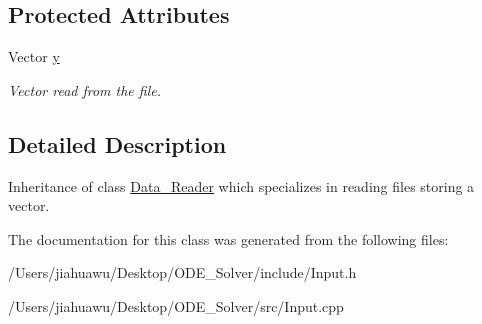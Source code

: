 \subsection*{Protected Attributes}
\begin{DoxyCompactItemize}
\item 
\mbox{\label{class_vector___reader_a9b12a16c14096fd15f2c32f0afbb3b53}} 
Vector \mbox{\hyperlink{class_vector___reader_a9b12a16c14096fd15f2c32f0afbb3b53}{y}}
\begin{DoxyCompactList}\small\item\em Vector read from the file. \end{DoxyCompactList}\end{DoxyCompactItemize}


\subsection{Detailed Description}
Inheritance of class \mbox{\hyperlink{class_data___reader}{Data\+\_\+\+Reader}} which specializes in reading files storing a vector. 

The documentation for this class was generated from the following files\+:\begin{DoxyCompactItemize}
\item 
/\+Users/jiahuawu/\+Desktop/\+O\+D\+E\+\_\+\+Solver/include/Input.\+h\item 
/\+Users/jiahuawu/\+Desktop/\+O\+D\+E\+\_\+\+Solver/src/Input.\+cpp\end{DoxyCompactItemize}
